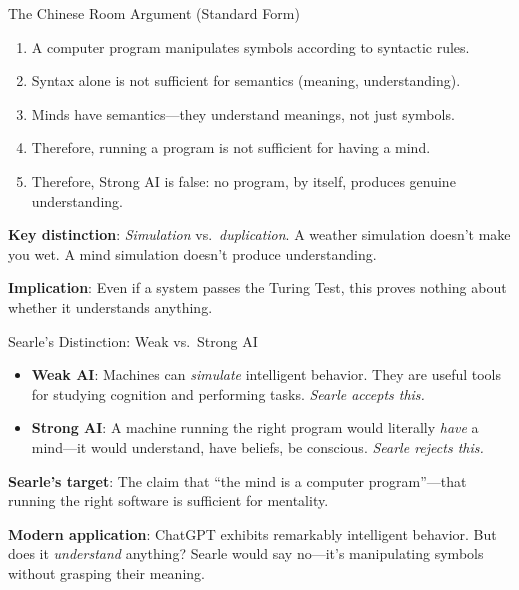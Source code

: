 ﻿\documentclass[aspectratio=169,11pt]{beamer}
\begin{document}
\begin{frame}{The Chinese Room Argument (Standard Form)}
\begin{objectionbox}
\small
\begin{enumerate}
    \item A computer program manipulates symbols according to syntactic rules.
    \item Syntax alone is not sufficient for semantics (meaning, understanding).
    \item Minds have semantics---they understand meanings, not just symbols.
    \item Therefore, running a program is not sufficient for having a mind.
    \item Therefore, Strong AI is false: no program, by itself, produces genuine understanding.
\end{enumerate}
\end{objectionbox}

\vspace{0.2em}
\textbf{Key distinction}: \emph{Simulation} vs.\ \emph{duplication}. A weather simulation doesn't make you wet. A mind simulation doesn't produce understanding.

\vspace{0.2em}
\textbf{Implication}: Even if a system passes the Turing Test, this proves nothing about whether it understands anything.
\end{frame}

\begin{frame}{Searle's Distinction: Weak vs.\ Strong AI}
\begin{conceptbox}
\small
\begin{itemize}
    \item \textbf{Weak AI}: Machines can \emph{simulate} intelligent behavior. They are useful tools for studying cognition and performing tasks. \emph{Searle accepts this.}
    \item \textbf{Strong AI}: A machine running the right program would literally \emph{have} a mind---it would understand, have beliefs, be conscious. \emph{Searle rejects this.}
\end{itemize}
\end{conceptbox}

\vspace{0.3em}
\textbf{Searle's target}: The claim that ``the mind is a computer program''---that running the right software is sufficient for mentality.

\vspace{0.3em}
\textbf{Modern application}: ChatGPT exhibits remarkably intelligent behavior. But does it \emph{understand} anything? Searle would say no---it's manipulating symbols without grasping their meaning.
\end{frame}
\end{document}
